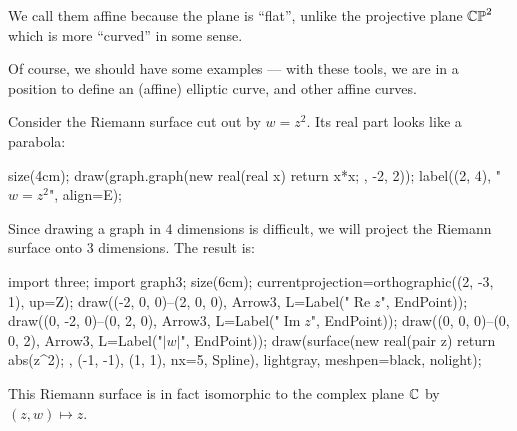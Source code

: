 We call them affine because the plane is ``flat'', unlike the projective plane $\mathbb{CP}^2$ which is
more ``curved'' in some sense.

Of course, we should have some examples --- with these tools, we are in a position to define an
(affine) elliptic curve, and other affine curves.

\begin{example}[A parabola]
	Consider the Riemann surface cut out by $w = z^2$.
	Its real part looks like a parabola:
	\begin{center}
		\begin{asy}
			size(4cm);
			draw(graph.graph(new real(real x){ return x*x; }, -2, 2));
			label((2, 4), "$w=z^2$", align=E);
		\end{asy}
	\end{center}
	Since drawing a graph in $4$ dimensions is difficult, we will project the Riemann surface onto
	$3$ dimensions.
	The result is:
	\begin{center}
		\begin{asy}
			import three;
			import graph3;
			size(6cm);
			currentprojection=orthographic((2, -3, 1), up=Z);
			draw((-2, 0, 0)--(2, 0, 0), Arrow3, L=Label("$\operatorname{Re} z$", EndPoint));
			draw((0, -2, 0)--(0, 2, 0), Arrow3, L=Label("$\operatorname{Im} z$", EndPoint));
			draw((0, 0, 0)--(0, 0, 2), Arrow3, L=Label("$|w|$", EndPoint));
			draw(surface(new real(pair z){ return abs(z^2); }, (-1, -1), (1, 1), nx=5, Spline),
			lightgray, meshpen=black, nolight);
		\end{asy}
	\end{center}

	This Riemann surface is in fact isomorphic to the complex plane $\mathbb C$ by $(z, w) \mapsto z$.
\end{example}

